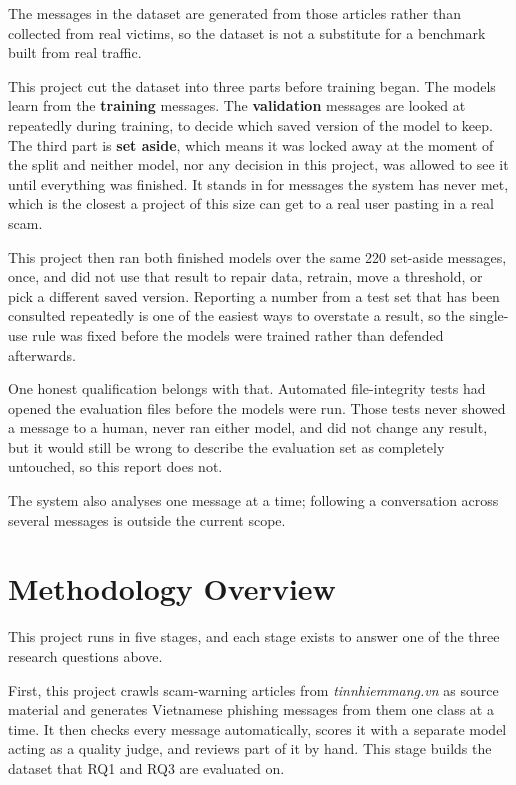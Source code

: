 The messages in the dataset are generated from those articles rather than collected from real victims, so the dataset is not a substitute for a benchmark built from real traffic.

This project cut the dataset into three parts before training began. The models learn from the \textbf{training} messages. The \textbf{validation} messages are looked at repeatedly during training, to decide which saved version of the model to keep. The third part is \textbf{set aside}, which means it was locked away at the moment of the split and neither model, nor any decision in this project, was allowed to see it until everything was finished. It stands in for messages the system has never met, which is the closest a project of this size can get to a real user pasting in a real scam.

This project then ran both finished models over the same 220 set-aside messages, once, and did not use that result to repair data, retrain, move a threshold, or pick a different saved version. Reporting a number from a test set that has been consulted repeatedly is one of the easiest ways to overstate a result, so the single-use rule was fixed before the models were trained rather than defended afterwards.

One honest qualification belongs with that. Automated file-integrity tests had opened the evaluation files before the models were run. Those tests never showed a message to a human, never ran either model, and did not change any result, but it would still be wrong to describe the evaluation set as completely untouched, so this report does not.

The system also analyses one message at a time; following a conversation across several messages is outside the current scope.

\section{Methodology Overview}
This project runs in five stages, and each stage exists to answer one of the three research questions above.

First, this project crawls scam-warning articles from \textit{tinnhiemmang.vn} as source material and generates Vietnamese phishing messages from them one class at a time. It then checks every message automatically, scores it with a separate model acting as a quality judge, and reviews part of it by hand. This stage builds the dataset that RQ1 and RQ3 are evaluated on.

